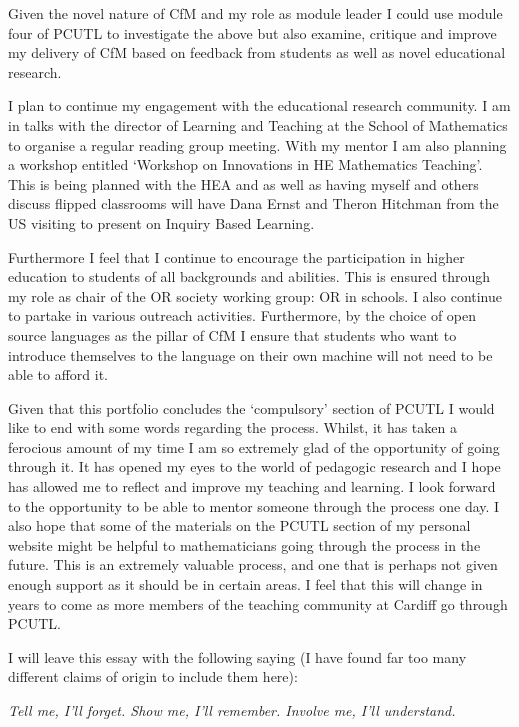 \documentclass{article}
\begin{document}
Given the novel nature of CfM and my role as module leader I could use module four of PCUTL to investigate the above but also examine, critique and improve my delivery of CfM based on feedback from students as well as novel educational research.

I plan to continue my engagement with the educational research community. I am in talks with the director of Learning and Teaching at the School of Mathematics to organise a regular reading group meeting. With my mentor I am also planning a workshop entitled `Workshop on Innovations in HE Mathematics Teaching'. This is being planned with the HEA and as well as having myself and others discuss flipped classrooms will have Dana Ernst and Theron Hitchman from the US visiting to present on Inquiry Based Learning.

Furthermore I feel that I continue to encourage the participation in higher education to students of all backgrounds and abilities. This is ensured through my role as chair of the OR society working group: OR in schools. I also continue to partake in various outreach activities. Furthermore, by the choice of open source languages as the pillar of CfM I ensure that students who want to introduce themselves to the language on their own machine will not need to be able to afford it.

Given that this portfolio concludes the `compulsory' section of PCUTL I would like to end with some words regarding the process. Whilst, it has taken a ferocious amount of my time I am so extremely glad of the opportunity of going through it. It has opened my eyes to the world of pedagogic research and I hope has allowed me to reflect and improve my teaching and learning. I look forward to the opportunity to be able to mentor someone through the process one day. I also hope that some of the materials on the PCUTL section of my personal website might be helpful to mathematicians going through the process in the future. This is an extremely valuable process, and one that is perhaps not given enough support as it should be in certain areas. I feel that this will change  in years to come as more members of the teaching community at Cardiff go through PCUTL.

I will leave this essay with the following saying (I have found far too many different claims of origin to include them here):

\begin{center}
\textit{Tell me, I'll forget. Show me, I'll remember. Involve me, I'll understand.}
\end{center}

\newpage


\end{document}
